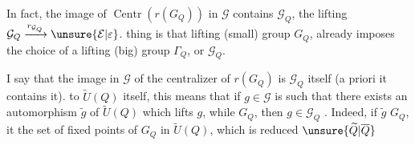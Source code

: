 In fact, the image of $\operatorname{Centr}(r(G_Q))$ in $\mathcal G$ contains $\mathcal G_Q$,    the lifting $\mathcal G_Q\xrightarrow{r_{\mathcal G_Q}}\unsure{\mathcal E|\varepsilon}$.
  thing is that   lifting  (small) group $G_Q$, already imposes the choice of a lifting  (big) group $\Gamma_Q$, or $\mathcal G_Q$.

 I say that the image in $\mathcal G$ of the centralizer  of $r(G_Q)$ is $\mathcal G_Q$ itself (a priori it contains it).
 to $\widetilde U(Q)$ itself, this means that  if $g\in\mathcal G$ is such that there exists an automorphism $\widetilde g$ of $\widetilde U(Q)$ which lifts $g$, while     $G_Q$, then $g\in\mathcal G_Q$ . Indeed, if $\widetilde g$    $G_Q$, it  the set of fixed points of $G_Q$ in $\widetilde U(Q)$, which is reduced   $\unsure{\widetilde Q|\overline Q}$
